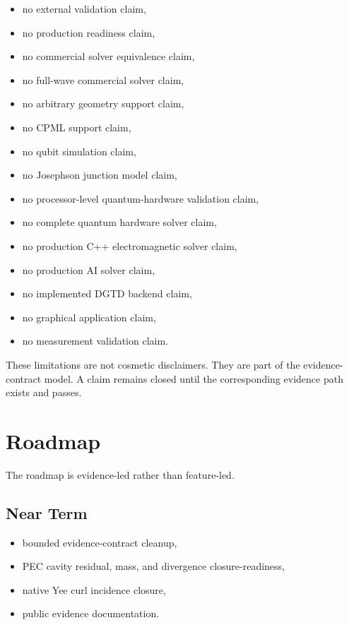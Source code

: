 \documentclass[11pt,a4paper]{article}
\begin{document}
\begin{itemize}
  \item no external validation claim,
  \item no production readiness claim,
  \item no commercial solver equivalence claim,
  \item no full-wave commercial solver claim,
  \item no arbitrary geometry support claim,
  \item no CPML support claim,
  \item no qubit simulation claim,
  \item no Josephson junction model claim,
  \item no processor-level quantum-hardware validation claim,
  \item no complete quantum hardware solver claim,
  \item no production C++ electromagnetic solver claim,
  \item no production AI solver claim,
  \item no implemented DGTD backend claim,
  \item no graphical application claim,
  \item no measurement validation claim.
\end{itemize}

These limitations are not cosmetic disclaimers. They are part of the evidence-contract model. A claim remains closed until the corresponding evidence path exists and passes.

\section{Roadmap}

The roadmap is evidence-led rather than feature-led.

\subsection{Near Term}

\begin{itemize}
  \item bounded evidence-contract cleanup,
  \item PEC cavity residual, mass, and divergence closure-readiness,
  \item native Yee curl incidence closure,
  \item public evidence documentation.
\end{itemize}
\end{document}
